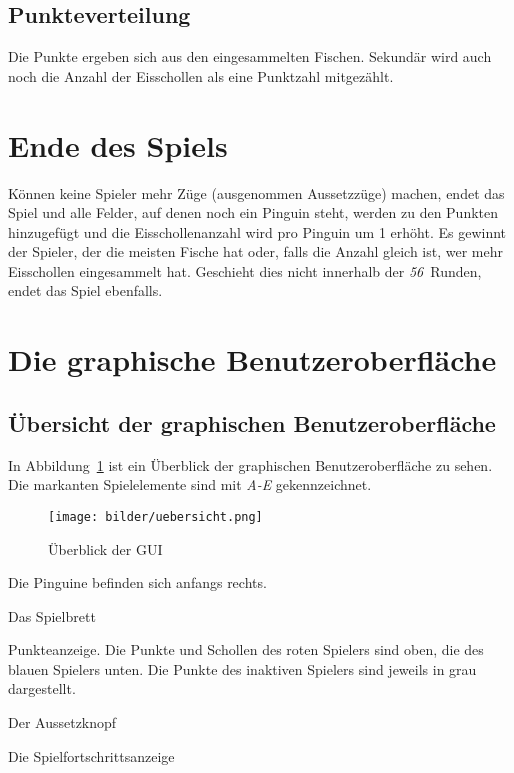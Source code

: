 \documentclass[a4paper, ngerman]{scrartcl}
\newcommand{\RundenAnzahl}{\emph{56}}
\begin{document}
\subsection{Punkteverteilung}
Die Punkte ergeben sich aus den eingesammelten Fischen. Sekundär wird auch
noch die Anzahl der Eisschollen als eine Punktzahl mitgezählt.

	
\section{Ende des Spiels} 
	Können keine Spieler mehr Züge (ausgenommen Aussetzzüge) machen, endet das
	Spiel und alle Felder, auf denen noch ein Pinguin steht, werden zu den Punkten
	hinzugefügt und die Eisschollenanzahl wird pro Pinguin um 1 erhöht. Es
	gewinnt der Spieler, der die meisten Fische hat oder, falls die Anzahl gleich
	ist, wer mehr Eisschollen eingesammelt hat.
	Geschieht dies nicht innerhalb der \RundenAnzahl\ Runden, endet das Spiel
	ebenfalls.
	
\section{Die graphische Benutzeroberfläche}
\subsection{Übersicht der graphischen Benutzeroberfläche}
	In Abbildung~\ref{fig:GUI} ist ein Überblick der graphischen Benutzeroberfläche
	zu sehen. Die markanten Spielelemente sind mit \emph{A-E} gekennzeichnet.
	
	 \begin{figure}[h!]
		\centering		
		\texttt{[image: bilder/uebersicht.png]} 
		\caption{Überblick der GUI}
		\label{fig:GUI}
	\end{figure} 
\begin{compactenum}[A)] 
\item Die Pinguine befinden sich anfangs rechts.
\item Das Spielbrett  
\item Punkteanzeige.
 Die Punkte und Schollen des roten Spielers sind 
oben, die des blauen Spielers unten. Die Punkte des inaktiven Spielers sind
jeweils in grau dargestellt.
\item Der Aussetzknopf
\item  Die Spielfortschrittsanzeige
	\end{compactenum}
	
\end{document}
